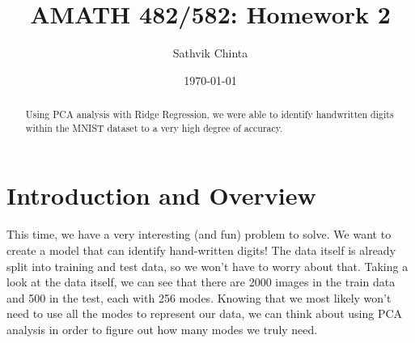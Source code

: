 \documentclass[11pt]{amsart}
\title{AMATH 482/582: Homework 2}
\author{Sathvik Chinta} %
\date{\today} %
\begin{document}
\maketitle 

\begin{abstract}
    Using PCA analysis with Ridge Regression, we were able to identify handwritten digits within
    the MNIST dataset to a very high degree of accuracy. 
\end{abstract}


\section{Introduction and Overview}\label{sec:Introduction}
This time, we have a very interesting (and fun) problem to solve. We want to create a model that can identify hand-written digits!
The data itself is already split into training and test data, so we won't have to worry about that. Taking a look at the data itself, 
we can see that there are 2000 images in the train data and 500 in the test, each with 256 modes. Knowing that we most likely won't need to use 
all the modes to represent our data, we can think about using PCA analysis in order to figure out how many modes we truly need.



\end{document}
